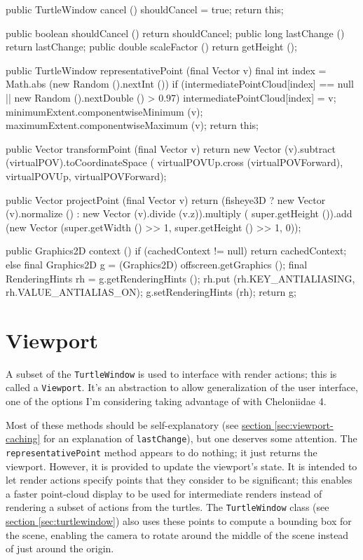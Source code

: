 \documentclass{report}
\newcommand{\Ref}[2]{\hyperref[#2]{#1 \ref*{#2}}}
\begin{document}
\begin{javacode}
{  public TurtleWindow cancel () {shouldCancel = true; return this;}

  public boolean shouldCancel () {return shouldCancel;}
  public long    lastChange   () {return lastChange;}
  public double  scaleFactor  () {return getHeight ();}

  public TurtleWindow representativePoint (final Vector v) {
    final int index = Math.abs (new Random ().nextInt ()) %
    if (intermediatePointCloud[index] == null || new Random ().nextDouble () > 0.97) intermediatePointCloud[index] = v;
    minimumExtent.componentwiseMinimum (v);
    maximumExtent.componentwiseMaximum (v);
    return this;
  }

  public Vector transformPoint (final Vector v)
    {return new Vector (v).subtract (virtualPOV).toCoordinateSpace (
      virtualPOVUp.cross (virtualPOVForward), virtualPOVUp, virtualPOVForward);}

  public Vector projectPoint (final Vector v)
    {return (fisheye3D ? new Vector (v).normalize () :
                         new Vector (v).divide (v.z)).multiply (
                           super.getHeight ()).add (new Vector (super.getWidth () >> 1, super.getHeight () >> 1, 0));}

  public Graphics2D context () {
    if (cachedContext != null) return cachedContext;
    else {
      final Graphics2D     g  = (Graphics2D) offscreen.getGraphics ();
      final RenderingHints rh = g.getRenderingHints ();
      rh.put (rh.KEY_ANTIALIASING, rh.VALUE_ANTIALIAS_ON);
      g.setRenderingHints (rh);
      return g;
    }
  }
}
\end{javacode}

\section {Viewport} \label{sec:viewport}
      A subset of the {\tt TurtleWindow} is used to interface with render actions; this is called a {\tt Viewport}. It's an abstraction to allow generalization
      of the user interface, one of the options I'm considering taking advantage of with Cheloniidae 4.

      Most of these methods should be self-explanatory (see \Ref{section}{sec:viewport-caching} for an explanation of {\tt lastChange}), but one deserves some
      attention. The {\tt representativePoint} method appears to do nothing; it just returns the viewport. However, it is provided to update the viewport's
      state. It is intended to let render actions specify points that they consider to be significant; this enables a faster point-cloud display to be used for
      intermediate renders instead of rendering a subset of actions from the turtles. The {\tt TurtleWindow} class (see \Ref{section}{sec:turtlewindow}) also
      uses these points to compute a bounding box for the scene, enabling the camera to rotate around the middle of the scene instead of just around the origin.
\end{document}
